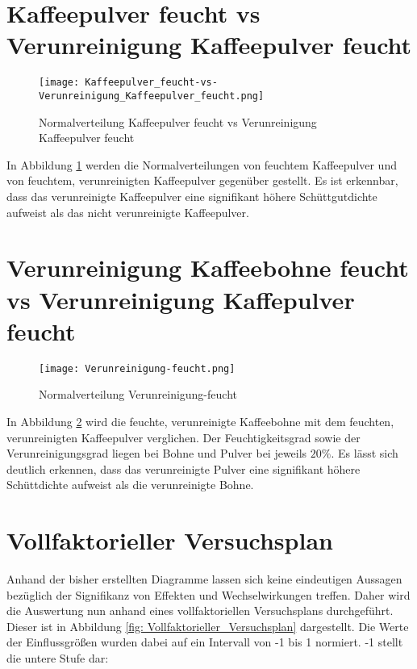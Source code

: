 \section{Kaffeepulver feucht vs Verunreinigung Kaffeepulver feucht}
 \begin{figure}[H]
    \centering
    \texttt{[image: Kaffeepulver\_feucht-vs-Verunreinigung\_Kaffeepulver\_feucht.png]}
    \caption{Normalverteilung Kaffeepulver feucht vs Verunreinigung Kaffeepulver feucht}
    \label{fig: Norm.Kaffeepulver_feucht-vs-Verunreinigung_Kaffeepulver_feucht}
\end{figure}

In Abbildung \ref{fig: Norm.Kaffeepulver_feucht-vs-Verunreinigung_Kaffeepulver_feucht} werden die Normalverteilungen von feuchtem
Kaffeepulver und von feuchtem, verunreinigten Kaffeepulver gegenüber gestellt. Es ist erkennbar, dass das verunreinigte Kaffeepulver
eine signifikant höhere Schüttgutdichte aufweist als das nicht verunreinigte Kaffeepulver.

\section{Verunreinigung Kaffeebohne feucht vs Verunreinigung Kaffepulver feucht}
 \begin{figure}[H]
    \centering
    \texttt{[image: Verunreinigung-feucht.png]}
    \caption{Normalverteilung Verunreinigung-feucht}
    \label{fig: Norm.Verunreinigung-feucht}
\end{figure}

In Abbildung \ref{fig: Norm.Verunreinigung-feucht} wird die feuchte, verunreinigte Kaffeebohne mit dem feuchten, verunreinigten
Kaffeepulver verglichen. Der Feuchtigkeitsgrad sowie der Verunreinigungsgrad liegen bei Bohne und Pulver bei jeweils $20\%$.
Es lässt sich deutlich erkennen, dass das verunreinigte Pulver eine signifikant höhere Schüttdichte aufweist als die verunreinigte
Bohne.

\section{Vollfaktorieller Versuchsplan}
    Anhand der bisher erstellten Diagramme lassen sich keine eindeutigen Aussagen  bezüglich der
    Signifikanz von Effekten und Wechselwirkungen treffen. Daher wird die Auswertung nun anhand eines
    vollfaktoriellen Versuchsplans durchgeführt. Dieser ist in Abbildung
    \ref{fig: Vollfaktorieller_Versuchsplan} dargestellt. Die Werte der Einflussgrößen wurden dabei
    auf ein Intervall von -1 bis 1 normiert. -1 stellt die untere Stufe dar:

